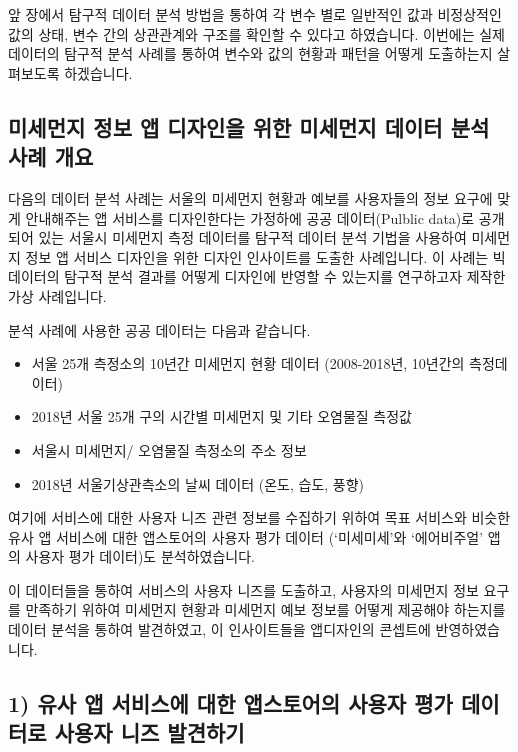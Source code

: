 \documentclass[
  letterpaper,
]{book}
\providecommand{\tightlist}{%
  \setlength{\itemsep}{0pt}\setlength{\parskip}{0pt}}\usepackage{longtable,booktabs,array}
\begin{document}
앞 장에서 탐구적 데이터 분석 방법을 통하여 각 변수 별로 일반적인 값과
비정상적인 값의 상태, 변수 간의 상관관계와 구조를 확인할 수 있다고
하였습니다. 이번에는 실제 데이터의 탐구적 분석 사례를 통하여 변수와 값의
현황과 패턴을 어떻게 도출하는지 살펴보도록 하겠습니다.

\subsection{미세먼지 정보 앱 디자인을 위한 미세먼지 데이터 분석 사례
개요}\label{uxbbf8uxc138uxba3cuxc9c0-uxc815uxbcf4-uxc571-uxb514uxc790uxc778uxc744-uxc704uxd55c-uxbbf8uxc138uxba3cuxc9c0-uxb370uxc774uxd130-uxbd84uxc11d-uxc0acuxb840-uxac1cuxc694}

다음의 데이터 분석 사례는 서울의 미세먼지 현황과 예보를 사용자들의 정보
요구에 맞게 안내해주는 앱 서비스를 디자인한다는 가정하에 공공
데이터(Pulblic data)로 공개되어 있는 서울시 미세먼지 측정 데이터를
탐구적 데이터 분석 기법을 사용하여 미세먼지 정보 앱 서비스 디자인을 위한
디자인 인사이트를 도출한 사례입니다. 이 사례는 빅데이터의 탐구적 분석
결과를 어떻게 디자인에 반영할 수 있는지를 연구하고자 제작한 가상
사례입니다.

분석 사례에 사용한 공공 데이터는 다음과 같습니다.

\begin{itemize}
\tightlist
\item
  서울 25개 측정소의 10년간 미세먼지 현황 데이터 (2008-2018년, 10년간의
  측정데이터)
\item
  2018년 서울 25개 구의 시간별 미세먼지 및 기타 오염물질 측정값
\item
  서울시 미세먼지/ 오염물질 측정소의 주소 정보
\item
  2018년 서울기상관측소의 날씨 데이터 (온도, 습도, 풍향)
\end{itemize}

여기에 서비스에 대한 사용자 니즈 관련 정보를 수집하기 위하여 목표
서비스와 비슷한 유사 앱 서비스에 대한 앱스토어의 사용자 평가 데이터
(`미세미세'와 `에어비주얼' 앱의 사용자 평가 데이터)도 분석하였습니다.

이 데이터들을 통하여 서비스의 사용자 니즈를 도출하고, 사용자의 미세먼지
정보 요구를 만족하기 위하여 미세먼지 현황과 미세먼지 예보 정보를 어떻게
제공해야 하는지를 데이터 분석을 통하여 발견하였고, 이 인사이트들을
앱디자인의 콘셉트에 반영하였습니다.

\subsection{1) 유사 앱 서비스에 대한 앱스토어의 사용자 평가 데이터로
사용자 니즈
발견하기}\label{uxc720uxc0ac-uxc571-uxc11cuxbe44uxc2a4uxc5d0-uxb300uxd55c-uxc571uxc2a4uxd1a0uxc5b4uxc758-uxc0acuxc6a9uxc790-uxd3c9uxac00-uxb370uxc774uxd130uxb85c-uxc0acuxc6a9uxc790-uxb2c8uxc988-uxbc1cuxacacuxd558uxae30}
\end{document}
